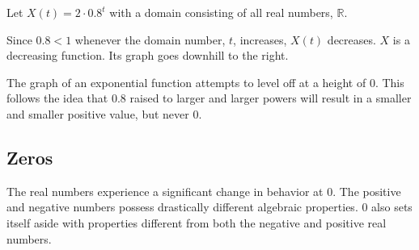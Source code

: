 \documentclass{ximera}
\begin{document}
\begin{example}

Let $X(t) = 2 \cdot 0.8^t$ with a domain consisting of all real numbers, $\mathbb{R}$.


Since $0.8 < 1$ whenever the domain number, $t$, increases, $X(t)$ decreases.  $X$ is a decreasing function.  Its graph goes downhill to the right.









\begin{image}
\end{image}






\end{example}

The graph of an exponential function attempts to level off at a height of $0$.  This follows the idea that $0.8$ raised to larger and larger powers will result in a smaller and smaller positive value, but never $0$.












\subsection{Zeros}

The real numbers experience a significant change in behavior at $0$.  The positive and negative numbers possess drastically different algebraic properties.  $0$ also sets itself aside with properties different from both the negative and positive real numbers.
\end{document}
